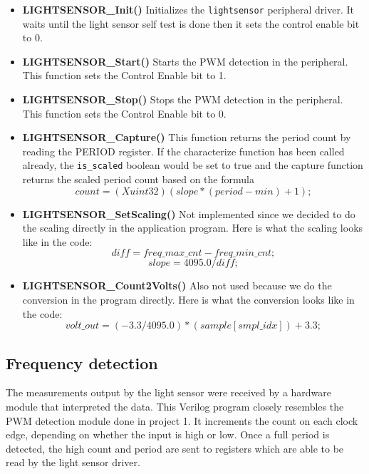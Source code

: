 \documentclass[11pt]{article}
\begin{document}
\begin{itemize}
\item \textbf{LIGHTSENSOR\_Init()} Initializes the \texttt{lightsensor} peripheral driver. It waits until the light sensor self test is done then it sets the control enable bit to 0.
\item \textbf{LIGHTSENSOR\_Start()} Starts the PWM detection in the peripheral. This function sets the Control Enable bit to 1.
\item \textbf{LIGHTSENSOR\_Stop()} Stops the PWM detection in the peripheral. This function sets the Control Enable bit to 0.
\item \textbf{LIGHTSENSOR\_Capture()} This function returns the period count by reading the PERIOD register. If the characterize function has been called already, the \texttt{is\_scaled} boolean would be set to true and the capture function returns the scaled period count based on the formula  
\begin{equation}
count = (Xuint32)(slope * (period - min)+ 1); \nonumber
\end{equation}

\item \textbf{LIGHTSENSOR\_SetScaling()} Not implemented since we decided to do the scaling directly in the application program. Here is what the scaling looks like in the code:
\begin{equation}
diff = freq\_max\_cnt - freq\_min\_cnt; \nonumber
\end{equation}
\begin{equation}
slope = 4095.0 / diff; \nonumber
\end{equation}

\item \textbf{LIGHTSENSOR\_Count2Volts()} Also not used because we do the conversion in the program directly. Here is what the conversion looks like in the code:
\begin{equation}
volt\_out = (-3.3 / 4095.0) * (sample[smpl\_idx]) + 3.3;  \nonumber
\end{equation}
\end{itemize}

%  

\subsection{Frequency detection}
The measurements output by the light sensor were received by a hardware module that interpreted the data.  This Verilog program closely resembles the PWM detection module done in project 1.  It increments the count on each clock edge, depending on whether the input is high or low.  Once a full period is detected, the high count and period are sent to registers which are able to be read by the light sensor driver.  
\end{document}
